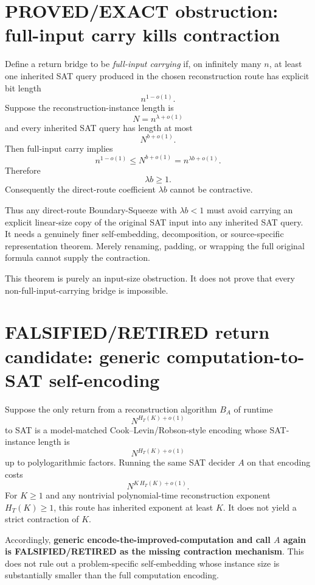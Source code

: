 \documentclass[11pt]{article}
\begin{document}
\section*{PROVED/EXACT obstruction: full-input carry kills contraction}
Define a return bridge to be \emph{full-input carrying} if, on infinitely many \(n\), at least one inherited SAT query produced in the chosen reconstruction route has explicit bit length
\[
n^{1-o(1)}.
\]
Suppose the reconstruction-instance length is
\[
N=n^{\lambda+o(1)}
\]
and every inherited SAT query has length at most
\[
N^{b+o(1)}.
\]
Then full-input carry implies
\[
n^{1-o(1)}
\le
N^{b+o(1)}
=
n^{\lambda b+o(1)}.
\]
Therefore
\[
\boxed{\lambda b\ge1.}
\]
Consequently the direct-route coefficient \(\lambda b\) cannot be contractive.

Thus any direct-route Boundary-Squeeze with \(\lambda b<1\) must avoid carrying an explicit linear-size copy of the original SAT input into any inherited SAT query. It needs a genuinely finer self-embedding, decomposition, or source-specific representation theorem. Merely renaming, padding, or wrapping the full original formula cannot supply the contraction.

This theorem is purely an input-size obstruction. It does not prove that every non-full-input-carrying bridge is impossible.

\section*{FALSIFIED/RETIRED return candidate: generic computation-to-SAT self-encoding}
Suppose the only return from a reconstruction algorithm \(B_A\) of runtime
\[
N^{H_T(K)+o(1)}
\]
to SAT is a model-matched Cook--Levin/Robson-style encoding whose SAT-instance length is
\[
N^{H_T(K)+o(1)}
\]
up to polylogarithmic factors. Running the same SAT decider \(A\) on that encoding costs
\[
N^{K\,H_T(K)+o(1)}.
\]
For \(K\ge1\) and any nontrivial polynomial-time reconstruction exponent \(H_T(K)\ge1\), this route has inherited exponent at least \(K\). It does not yield a strict contraction of \(K\).

Accordingly, \textbf{generic encode-the-improved-computation and call \(A\) again is FALSIFIED/RETIRED as the missing contraction mechanism}. This does not rule out a problem-specific self-embedding whose instance size is substantially smaller than the full computation encoding.
\end{document}
